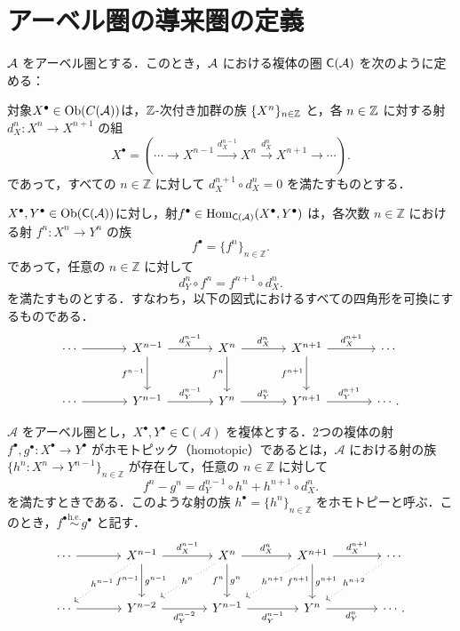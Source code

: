\section{アーベル圏の導来圏の定義}

\begin{defn}\cite[p.300]{KS06}
${\mathcal A}$ をアーベル圏とする．このとき，${\mathcal A}$ における複体の圏 $\mathsf{C}({\mathcal A})$ を次のように定める：

対象$X^\bullet\in\mathrm{Ob}(C({\mathcal A}))$は，${\mathbb Z}$-次付き加群の族 $\{X^n\}_{n \in {\mathbb Z}}$ と，各 $n \in {\mathbb Z}$ に対する射 $d_{X}^n: X^n \to X^{n+1}$ の組
  \[
		X^\bullet = ( \cdots \to X^{n-1} \xrightarrow{d_{X}^{n-1}} X^n \xrightarrow{d_{X}^n} X^{n+1} \to \cdots ).
  \]
	であって，すべての $n \in \mathbb{Z}$ に対して $d_{X}^{n+1} \circ d_{X}^n = 0$ を満たすものとする．

	$X^\bullet , Y^\bullet\in\mathrm{Ob}(\mathsf{C}({\mathcal A}))$に対し，射$f^\bullet\in \operatorname{\mathrm{Hom}}_{\mathsf{C}({\mathcal A})}(X^\bullet,Y^\bullet)$ は，各次数 $n \in \mathbb{Z}$ における射 $f^n: X^n \to Y^n$ の族
  \[
    f^\bullet = \{f^n\}_{n \in \mathbb{Z}}.
  \]
  であって，任意の $n \in \mathbb{Z}$ に対して
  \[
    d_Y^n \circ f^n = f^{n+1} \circ d_X^n.
  \]
  を満たすものとする．すなわち，以下の図式におけるすべての四角形を可換にするものである．
		\[
\begin{tikzcd}[column sep=large, row sep=large]
  \cdots \ar[r] &
  X^{n-1} \ar[r,"d_X^{n-1}"] \ar[d,"f^{n-1}"'] &
  X^n \ar[r,"d_X^n"] \ar[d,"f^n"'] &
  X^{n+1} \ar[r,"d_X^{n+1}"] \ar[d,"f^{n+1}"'] &
  \cdots \\
  \cdots \ar[r] &
  Y^{n-1} \ar[r,"d_Y^{n-1}"] &
  Y^n \ar[r,"d_Y^n"] &
  Y^{n+1} \ar[r,"d_Y^{n+1}"] &
	\cdots .
\end{tikzcd}
	\]
\end{defn}

\begin{defn}\cite[p.272]{KS06}
	$\mathcal{A}$ をアーベル圏とし，$X^\bullet, Y^\bullet \in \mathsf{C}(\mathcal{A})$ を複体とする．2つの複体の射 $f^\bullet, g^\bullet: X^\bullet \to Y^\bullet$ がホモトピック（homotopic）であるとは，$\mathcal{A}$ における射の族 $\{h^n: X^n \to Y^{n-1}\}_{n \in \mathbb{Z}}$ が存在して，任意の $n \in \mathbb{Z}$ に対して
\[
  f^n - g^n = d_Y^{n-1} \circ h^n + h^{n+1} \circ d_X^n.
\]
を満たすときである．このような射の族 $h^\bullet = \{h^n\}_{n \in \mathbb{Z}}$ をホモトピーと呼ぶ．このとき，$f^\bullet \overset{\mathrm{h.e.}}{\sim} g^\bullet$ と記す．
\[\begin{tikzcd}[column sep=large, row sep=large]
  \cdots \ar[r] &
	X^{n-1} \ar[r,"d_X^{n-1}"] \ar[d,"f^{n-1}"',"g^{n-1}"] \ar[dl,dotted,"h^{n-1}"description] &
  X^n \ar[r,"d_X^n"] \ar[d,"f^n"',"g^n"] \ar[dl,dotted,"h^n"description] &
	X^{n+1} \ar[r,"d_X^{n+1}"] \ar[d,"f^{n+1}"',"g^{n+1}"] \ar[dl,dotted,"h^{n+1}"description] &
	\cdots\ar[dl,dotted,"h^{n+2}"description] \\
  \cdots \ar[r] &
  Y^{n-2} \ar[r,"d_Y^{n-2}"'] &
  Y^{n-1} \ar[r,"d_Y^{n-1}"'] &
  Y^n \ar[r,"d_Y^n"'] &
  \cdots .
\end{tikzcd}
\]

\end{defn}

